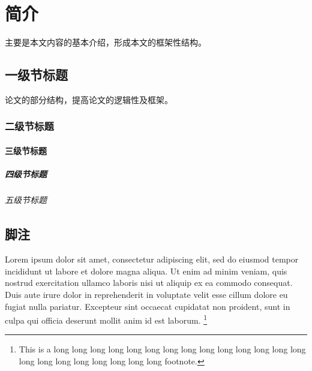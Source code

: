\chapter{简介}

主要是本文内容的基本介绍，形成本文的框架性结构。

\section{一级节标题}

论文的部分结构，提高论文的逻辑性及框架。

\subsection{二级节标题}

\subsubsection{三级节标题}

\paragraph{四级节标题}

\subparagraph{五级节标题}

\section{脚注}

Lorem ipsum dolor sit amet, consectetur adipiscing elit, sed do eiusmod tempor
incididunt ut labore et dolore magna aliqua. Ut enim ad minim veniam, quis
nostrud exercitation ullamco laboris nisi ut aliquip ex ea commodo consequat.
Duis aute irure dolor in reprehenderit in voluptate velit esse cillum dolore eu
fugiat nulla pariatur. Excepteur sint occaecat cupidatat non proident, sunt in
culpa qui officia deserunt mollit anim id est laborum.
\footnote{This is a long long long long long long long long long long long long
long long long long long long long long long long footnote.}
